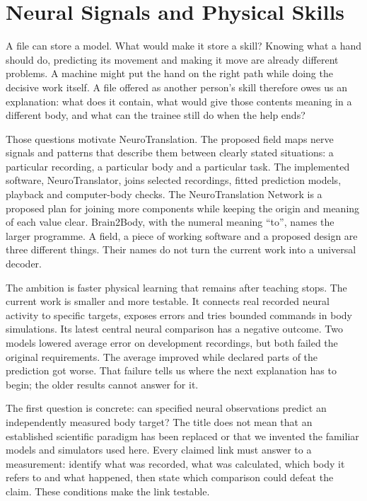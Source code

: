 \section{Neural Signals and Physical Skills}

A file can store a model. What would make it store a skill? Knowing what a hand
should do, predicting its movement and making it move are already different
problems. A machine might put the hand on the right path while doing the decisive
work itself. A file offered as another person's skill therefore owes us an
explanation: what does it contain, what would give those contents meaning in a
different body, and what can the trainee still do when the help ends?

Those questions motivate NeuroTranslation. The proposed field maps nerve signals
and patterns that describe them between clearly stated situations: a particular
recording, a particular body and a particular task. The implemented software,
NeuroTranslator, joins selected recordings, fitted prediction models, playback
and computer-body checks. The NeuroTranslation Network is a proposed plan for
joining more components while keeping the origin and meaning of each value
clear. Brain2Body, with the numeral meaning ``to'', names the larger programme.
A field, a piece of working software and a proposed design are three different
things. Their names do not turn the current work into a universal decoder.

The ambition is faster physical learning that remains after teaching stops.
The current work is smaller and more testable. It connects real recorded neural
activity to specific targets, exposes errors and tries bounded commands in
body simulations. Its latest central neural comparison has a negative outcome.
Two models lowered average error on development recordings, but both failed
the original requirements. The average improved while declared parts of the
prediction got worse. That failure tells us where the next explanation has to
begin; the older results cannot answer for it.

The first question is concrete: can specified neural observations predict an
independently measured body target? The title does not mean that an established
scientific paradigm has been replaced or that we invented the familiar models
and simulators used here. Every claimed link must answer
to a measurement: identify what was recorded, what was calculated, which body
it refers to and what happened, then state which comparison could defeat the
claim. These conditions make the link testable.

